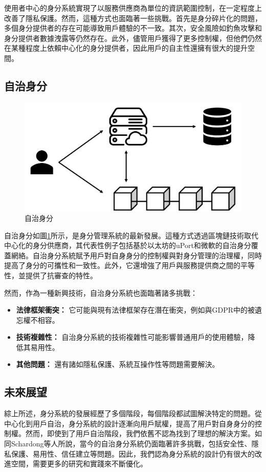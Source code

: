 使用者中心的身分系統實現了以服務供應商為單位的資訊範圍控制，在一定程度上改善了隱私保護。然而，這種方式也面臨著一些挑戰。首先是身分碎片化的問題，多個身分提供者的存在可能導致用戶體驗的不一致。其次，安全風險如釣魚攻擊和身分提供者數據洩露等仍然存在\cite{sun2012devil}。此外，儘管用戶獲得了更多控制權，但他們仍然在某種程度上依賴中心化的身分提供者，因此用戶的自主性還擁有很大的提升空間\cite{allen2016selfsovereign}。
\subsection{自治身分}
\begin{figure}
  \centering
  \includegraphics[width=\linewidth,keepaspectratio]{figures/self-sovereign-identity.png}
  \caption{自治身分}
  \label{fig:self-sovereign-identity}
\end{figure}
自治身分如圖\ref{fig:self-sovereign-identity}所示，是身分管理系統的最新發展\cite{preukschat2021self}。這種方式透過區塊鏈技術取代中心化的身分供應商，其代表性例子包括基於以太坊的uPort和微軟的自治身分覆蓋網絡\cite{lundkvist2017uport, microsoft2020ion}。自治身分系統賦予用戶對自身身分的控制權與對身分管理的治理權，同時提高了身分的可攜性和一致性。此外，它還增強了用戶與服務提供商之間的平等性，並提供了抗審查的特性。

然而，作為一種新興技術，自治身分系統也面臨著諸多挑戰\cite{s22155641}：
\begin{itemize}
  \item \textbf{法律框架衝突：} 它可能與現有法律框架存在潛在衝突，例如與GDPR中的被遺忘權不相容\cite{finck2018blockchains}。
  \item \textbf{技術複雜性：} 自治身分系統的技術複雜性可能影響普通用戶的使用體驗，降低其易用性\cite{kubach2020self}。
  \item \textbf{其他問題：} 還有諸如隱私保護、系統互操作性等問題需要解決。
\end{itemize}
\subsection{未來展望}
綜上所述，身分系統的發展經歷了多個階段，每個階段都試圖解決特定的問題。從中心化到用戶自治，身分系統的設計逐漸向用戶賦權，提高了用戶對自身身分的控制權。然而，即使到了用戶自治階段，我們依舊不認為找到了理想的解決方案。如同Schardong等人\cite{s22155641,soltani2021surveydid}所說，當今的自治身分系統仍面臨著許多挑戰，包括安全性、隱私保護、易用性、信任建立等問題。因此，我們認為身分系統的設計仍有很大的改進空間，需要更多的研究和實踐來不斷優化。
